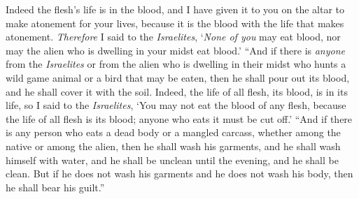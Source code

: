 \begin{biblechapter}
\verse Indeed the flesh’s life is in the blood, and I have given it to you on the altar to make atonement for your lives, because it is the blood with the life that makes atonement.
\verse \textit{Therefore} I said to the \textit{Israelites}, ‘\textit{None of you} may eat blood, nor may the alien who is dwelling in your midst eat blood.’
\verse “And if there is \textit{anyone} from the \textit{Israelites} or from the alien who is dwelling in their midst who hunts a wild game animal or a bird that may be eaten, then he shall pour out its blood, and he shall cover it with the soil.
\verse Indeed, the life of all flesh, its blood, is in its life, so I said to the \textit{Israelites}, ‘You may not eat the blood of any flesh, because the life of all flesh is its blood; anyone who eats it must be cut off.’
\verse “And if there is any person who eats a dead body or a mangled carcass, whether among the native or among the alien, then he shall wash his garments, and he shall wash himself with water, and he shall be unclean until the evening, and he shall be clean.
\verse But if he does not wash his garments and he does not wash his body, then he shall bear his guilt.”
\end{biblechapter}

